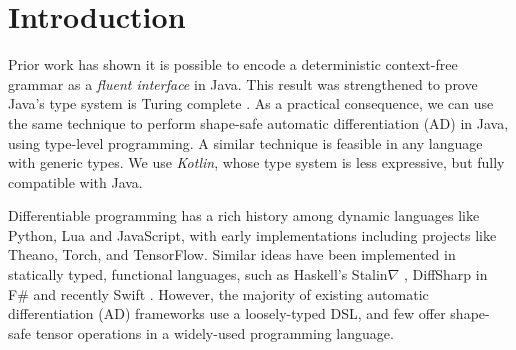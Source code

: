 \documentclass{article}
\begin{document}


\printAffiliationsAndNotice{}  %

\section{Introduction}
\label{submission}

Prior work has shown it is possible to encode a deterministic context-free grammar as a \textit{fluent interface} \cite{gil2016formal} in Java. This result was strengthened to prove Java's type system is Turing complete  \cite{Grigore:2017:JGT:3009837.3009871}. As a practical consequence, we can use the same technique to perform shape-safe automatic differentiation (AD) in Java, using type-level programming. A similar technique is feasible in any language with generic types. We use \textit{Kotlin}, whose type system is less expressive, but fully compatible with Java.

Differentiable programming has a rich history among dynamic languages like Python, Lua and JavaScript, with early implementations including projects like Theano, Torch, and TensorFlow. Similar ideas have been implemented in statically typed, functional languages, such as Haskell's Stalin$\nabla$ \cite{pearlmutter2008using}, DiffSharp in F\# \cite{DBLP:journals/corr/BaydinPS15} and recently Swift \cite{swift}. However, the majority of existing automatic differentiation (AD) frameworks use a loosely-typed DSL, and few offer shape-safe tensor operations in a widely-used programming language.
\end{document}
